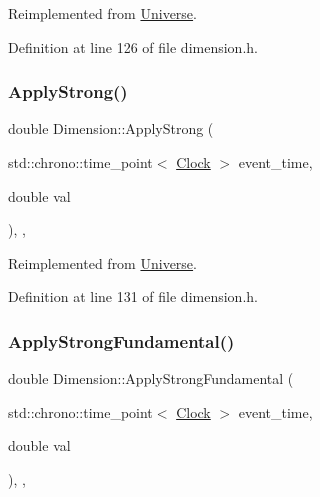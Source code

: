 Reimplemented from \mbox{\hyperlink{class_universe_a76c0b5e63c2a7d1988c44db341c3d64c}{Universe}}.



Definition at line 126 of file dimension.\+h.

\mbox{\label{class_dimension_a621e8f7f24db86e836c5b3da0f019290}} 
\subsubsection{\texorpdfstring{Apply\+Strong()}{ApplyStrong()}}
{\footnotesize\ttfamily double Dimension\+::\+Apply\+Strong (\begin{DoxyParamCaption}\item[{std\+::chrono\+::time\+\_\+point$<$ \mbox{\hyperlink{universe_8h_a0ef8d951d1ca5ab3cfaf7ab4c7a6fd80}{Clock}} $>$}]{event\+\_\+time,  }\item[{double}]{val }\end{DoxyParamCaption})\hspace{0.3cm}{\ttfamily [inline]}, {\ttfamily [final]}, {\ttfamily [virtual]}}



Reimplemented from \mbox{\hyperlink{class_universe_a906a88b37f10bfa630bef49dfd0e907a}{Universe}}.



Definition at line 131 of file dimension.\+h.

\mbox{\label{class_dimension_afb01fb9e469da18899d4b14e5f095ece}} 
\subsubsection{\texorpdfstring{Apply\+Strong\+Fundamental()}{ApplyStrongFundamental()}}
{\footnotesize\ttfamily double Dimension\+::\+Apply\+Strong\+Fundamental (\begin{DoxyParamCaption}\item[{std\+::chrono\+::time\+\_\+point$<$ \mbox{\hyperlink{universe_8h_a0ef8d951d1ca5ab3cfaf7ab4c7a6fd80}{Clock}} $>$}]{event\+\_\+time,  }\item[{double}]{val }\end{DoxyParamCaption})\hspace{0.3cm}{\ttfamily [inline]}, {\ttfamily [final]}, {\ttfamily [virtual]}}



